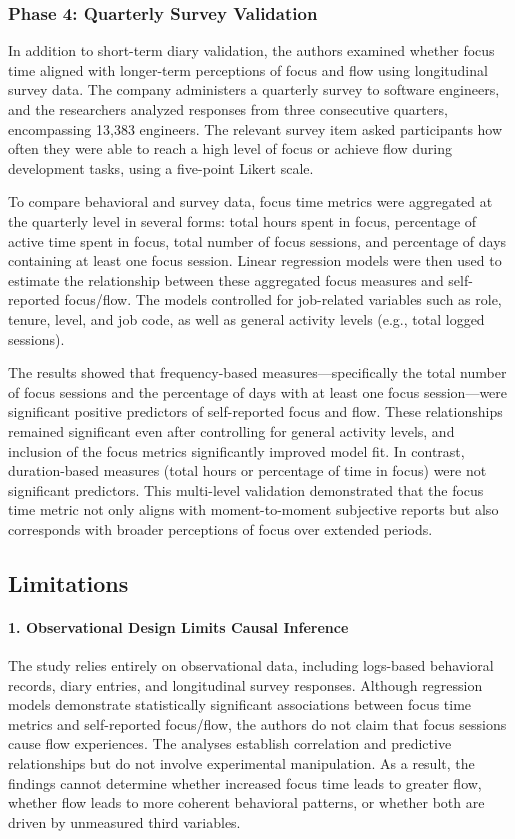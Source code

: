 \subsubsection{Phase 4: Quarterly Survey Validation}
In addition to short-term diary validation, the authors examined whether focus time aligned with longer-term perceptions of focus and flow using longitudinal survey data. The company administers a quarterly survey to software engineers, and the researchers analyzed responses from three consecutive quarters, encompassing 13,383 engineers. The relevant survey item asked participants how often they were able to reach a high level of focus or achieve flow during development tasks, using a five-point Likert scale.

To compare behavioral and survey data, focus time metrics were aggregated at the quarterly level in several forms: total hours spent in focus, percentage of active time spent in focus, total number of focus sessions, and percentage of days containing at least one focus session. Linear regression models were then used to estimate the relationship between these aggregated focus measures and self-reported focus/flow. The models controlled for job-related variables such as role, tenure, level, and job code, as well as general activity levels (e.g., total logged sessions).

The results showed that frequency-based measures—specifically the total number of focus sessions and the percentage of days with at least one focus session—were significant positive predictors of self-reported focus and flow. These relationships remained significant even after controlling for general activity levels, and inclusion of the focus metrics significantly improved model fit. In contrast, duration-based measures (total hours or percentage of time in focus) were not significant predictors. This multi-level validation demonstrated that the focus time metric not only aligns with moment-to-moment subjective reports but also corresponds with broader perceptions of focus over extended periods.

\subsection{Limitations}
\paragraph{1. Observational Design Limits Causal Inference}

The study relies entirely on observational data, including logs-based behavioral records, diary entries, and longitudinal survey responses. Although regression models demonstrate statistically significant associations between focus time metrics and self-reported focus/flow, the authors do not claim that focus sessions cause flow experiences. The analyses establish correlation and predictive relationships but do not involve experimental manipulation. As a result, the findings cannot determine whether increased focus time leads to greater flow, whether flow leads to more coherent behavioral patterns, or whether both are driven by unmeasured third variables.

